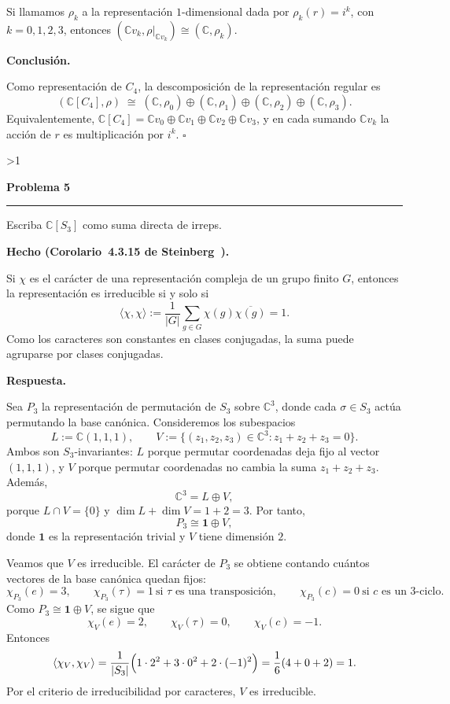 \documentclass[10pt,a4paper]{article}
\newcommand{\CC}{\mathbb{C}}
\newcommand{\inlinehead}[2][repblue]{%
  \par\smallskip
  {\color{#1}\bfseries #2.}\hspace{0.45em}%
}
\newcommand{\blockhead}[2][repteal]{%
  \par\smallskip
  {\color{#1}\bfseries #2.}\par\nobreak\smallskip
}
\newcommand{\answer}{\inlinehead{Respuesta}}
\newcommand{\subhead}[1]{\blockhead{#1}}
\newcounter{probcnt}
\newcommand{\problem}[2]{%
  \stepcounter{probcnt}%
  \ifnum\value{probcnt}>1\newpage\fi
  \par\vspace{0.25em}
  {\large\bfseries\color{repblue} Problema #1}\par
  {\color{repline}\rule{\linewidth}{0.55pt}}\par
  \begin{tcolorbox}[
    breakable,
    colback=white,
    colframe=repline,
    borderline west={1.6pt}{0pt}{repteal},
    left=0.7em,
    right=0.7em,
    top=0.35em,
    bottom=0.3em,
    before skip=0.35em,
    after skip=0.45em
  ]
    #2
  \end{tcolorbox}
}
\begin{document}
Si llamamos $\rho_k$ a la representación $1$-dimensional dada por
$\rho_k(r)=i^k$, con $k=0,1,2,3$, entonces
$(\CC v_k,\rho|_{\CC v_k})\cong (\CC,\rho_k)$.

\subhead{Conclusión}
Como representación de $C_4$, la descomposición de la representación regular es
\[
  (\CC[C_4],\rho)
  \;\cong\; (\CC,\rho_0)\oplus(\CC,\rho_1)\oplus(\CC,\rho_2)\oplus(\CC,\rho_3).
\]
Equivalentemente,
$\CC[C_4]=\CC v_0\oplus \CC v_1\oplus \CC v_2\oplus \CC v_3$,
y en cada sumando $\CC v_k$ la acción de $r$ es multiplicación por $i^k$.
\hfill$\square$

\problem{5}{%
Escriba $\CC[S_3]$ como suma directa de irreps.
}

\begingroup
\small
\setlength{\parskip}{0.25em}
\setlength{\abovedisplayskip}{0.35em}
\setlength{\belowdisplayskip}{0.35em}
\setlength{\abovedisplayshortskip}{0.2em}
\setlength{\belowdisplayshortskip}{0.2em}
\setlength{\jot}{0.15em}

\subhead{Hecho (Corolario~4.3.15 de Steinberg~\cite[Cor.~4.3.15]{Steinberg})}
Si $\chi$ es el carácter de una representación compleja de un grupo finito $G$,
entonces la representación es irreducible si y solo si
\[
  \langle \chi,\chi\rangle
  :=\frac{1}{|G|}\sum_{g\in G}\chi(g)\overline{\chi(g)}=1.
\]
Como los caracteres son constantes en clases conjugadas, la suma puede agruparse
por clases conjugadas.

\answer
Sea $P_3$ la representación de permutación de $S_3$ sobre $\CC^3$,
donde cada $\sigma\in S_3$ actúa permutando la base canónica.
Consideremos los subespacios
\[
  L:=\CC(1,1,1),
  \qquad
  V:=\{(z_1,z_2,z_3)\in\CC^3:z_1+z_2+z_3=0\}.
\]
Ambos son $S_3$-invariantes: $L$ porque permutar coordenadas deja fijo al vector
$(1,1,1)$, y $V$ porque permutar coordenadas no cambia la suma $z_1+z_2+z_3$.
Además,
\[
  \CC^3=L\oplus V,
\]
porque $L\cap V=\{0\}$ y $\dim L+\dim V=1+2=3$.
Por tanto,
\[
  P_3\cong \mathbf 1\oplus V,
\]
donde $\mathbf 1$ es la representación trivial y $V$ tiene dimensión $2$.

Veamos que $V$ es irreducible. El carácter de $P_3$ se obtiene contando
cuántos vectores de la base canónica quedan fijos:
\[
  \chi_{P_3}(e)=3,
  \qquad
  \chi_{P_3}(\tau)=1\ \text{si }\tau\text{ es una transposición},
  \qquad
  \chi_{P_3}(c)=0\ \text{si }c\text{ es un }3\text{-ciclo}.
\]
Como $P_3\cong \mathbf 1\oplus V$, se sigue que
\[
  \chi_V(e)=2,
  \qquad
  \chi_V(\tau)=0,
  \qquad
  \chi_V(c)=-1.
\]
Entonces
\[
  \langle \chi_V,\chi_V\rangle
  =\frac{1}{|S_3|}\Bigl(1\cdot 2^2+3\cdot 0^2+2\cdot (-1)^2\Bigr)
  =\frac{1}{6}(4+0+2)=1.
\]
Por el criterio de irreducibilidad por caracteres, $V$ es irreducible.
\end{document}
